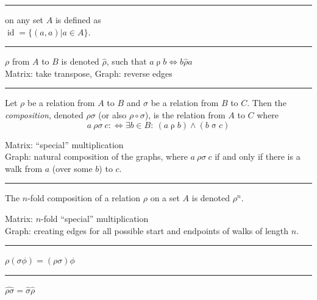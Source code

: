 \documentclass[a4paper]{extarticle}
\newcommand{\Com}{\textbf{Com.}\ }
\DeclareMathOperator{\id}{\text{id}}
\newcommand{\relrho}{\mathrel{\rho}}
\newcommand{\relsigma}{\mathrel{\sigma}}
\newcommand{\invrelrho}{\mathrel{\widehat{\rho}}}
\newcommand{\sep}{\vspace{5pt}\noindent\hrule\vspace{5pt}}
\begin{document}
\begin{multicols*}{2}

\sep

 on any set $A$ is defined as\\
$\id =\{(a,a)|a\in A\}$.

\sep

 $\rho$ from $A$ to $B$ is denoted $\widehat{\rho}$,
such that $a\relrho b \Longleftrightarrow b \invrelrho a$\\
Matrix: take transpose, Graph: reverse edges

\sep

 Let $\rho$ be a relation from $A$ to $B$ and
$\sigma$ be a relation from $B$ to $C$. Then the \emph{composition}, denoted
$\rho\sigma$ (or also $\rho\circ\sigma$), is the relation from $A$ to $C$ where
\[
a \ \rho\sigma \ c :\Longleftrightarrow \exists b\in B \colon \ (a\relrho b)
\land (b\relsigma c)
\]

Matrix: ``special'' multiplication\\
Graph: natural composition of the graphs, where $a \ \rho\sigma \ c$ if and only if
there is a walk from $a$ (over some $b$) to $c$.

\sep

\Def The $n$-fold composition of a relation $\rho$ on a set $A$ is denoted
$\rho^n$.

Matrix: $n$-fold ``special'' multiplication\\
Graph: creating edges for all possible start and endpoints of walks of
length $n$.

\sep

$\rho(\sigma\phi)=(\rho\sigma)\phi$

\sep

$\widehat{\rho\sigma}=\widehat{\sigma}\widehat{\rho}$


\end{multicols*}
\end{document}
